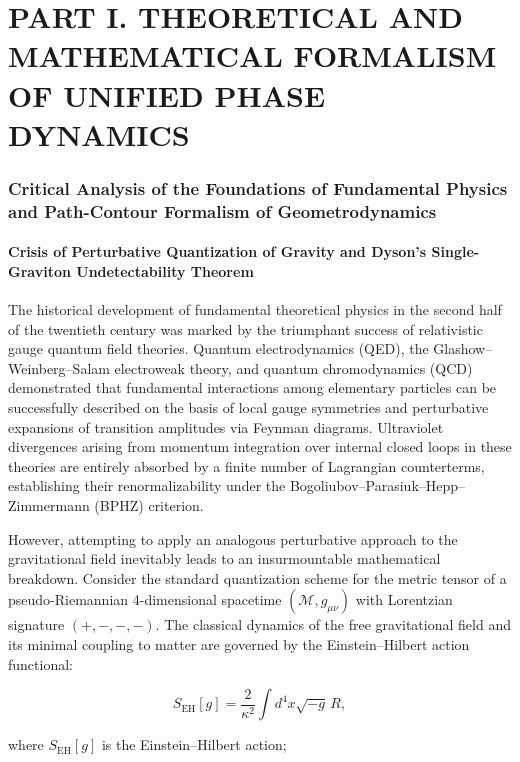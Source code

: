 \part{PART I. THEORETICAL AND MATHEMATICAL FORMALISM OF UNIFIED PHASE DYNAMICS}\label{part:1}

\section{Critical Analysis of the Foundations of Fundamental Physics and Path-Contour Formalism of Geometrodynamics}\label{sec:rozdil1}

\subsection{Crisis of Perturbative Quantization of Gravity and Dyson's Single-Graviton Undetectability Theorem}\label{sec:1.1}

The historical development of fundamental theoretical physics in the second half of the twentieth century was marked by the triumphant success of relativistic gauge quantum field theories. Quantum electrodynamics (QED), the Glashow--Weinberg--Salam electroweak theory, and quantum chromodynamics (QCD) demonstrated that fundamental interactions among elementary particles can be successfully described on the basis of local gauge symmetries and perturbative expansions of transition amplitudes via Feynman diagrams. Ultraviolet divergences arising from momentum integration over internal closed loops in these theories are entirely absorbed by a finite number of Lagrangian counterterms, establishing their renormalizability under the Bogoliubov--Parasiuk--Hepp--Zimmermann (BPHZ) criterion.

However, attempting to apply an analogous perturbative approach to the gravitational field inevitably leads to an insurmountable mathematical breakdown. Consider the standard quantization scheme for the metric tensor of a pseudo-Riemannian 4-dimensional spacetime $(\mathcal{M}, g_{\mu\nu})$ with Lorentzian signature $(+,-,-,-)$. The classical dynamics of the free gravitational field and its minimal coupling to matter are governed by the Einstein--Hilbert action functional:

\begin{equation}\label{eq:1.1}\tag{1.1}
S_{\text{EH}}[g] = \frac{2}{\kappa^2} \int d^4x \sqrt{-g} \, R,
\end{equation}

where $S_{\text{EH}}[g]$ is the Einstein--Hilbert action;  

